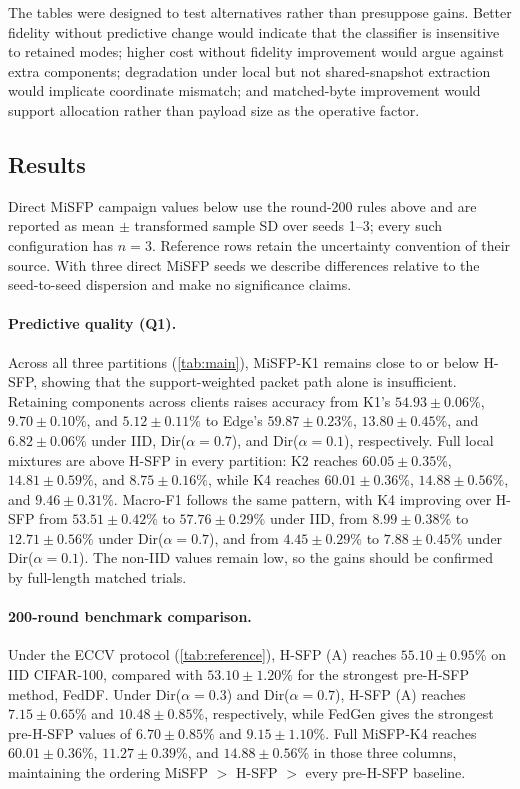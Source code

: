 The tables were designed to test alternatives rather than presuppose gains. Better fidelity without predictive change would indicate that the classifier is insensitive to retained modes; higher cost without fidelity improvement would argue against extra components; degradation under local but not shared-snapshot extraction would implicate coordinate mismatch; and matched-byte improvement would support allocation rather than payload size as the operative factor.

\subsection{Results}\label{sec:results}
Direct MiSFP campaign values below use the round-200 rules above and are reported as mean $\pm$ transformed sample SD over seeds 1--3; every such configuration has $n=3$. Reference rows retain the uncertainty convention of their source. With three direct MiSFP seeds we describe differences relative to the seed-to-seed dispersion and make no significance claims.

\paragraph{Predictive quality (Q1).}
Across all three partitions (\cref{tab:main}), MiSFP-K1 remains close to or below H-SFP, showing that the support-weighted packet path alone is insufficient. Retaining components across clients raises accuracy from K1's $54.93\pm0.06\%$, $9.70\pm0.10\%$, and $5.12\pm0.11\%$ to Edge's $59.87\pm0.23\%$, $13.80\pm0.45\%$, and $6.82\pm0.06\%$ under IID, Dir($\alpha{=}0.7$), and Dir($\alpha{=}0.1$), respectively. Full local mixtures are above H-SFP in every partition: K2 reaches $60.05\pm0.35\%$, $14.81\pm0.59\%$, and $8.75\pm0.16\%$, while K4 reaches $60.01\pm0.36\%$, $14.88\pm0.56\%$, and $9.46\pm0.31\%$. Macro-F1 follows the same pattern, with K4 improving over H-SFP from $53.51\pm0.42\%$ to $57.76\pm0.29\%$ under IID, from $8.99\pm0.38\%$ to $12.71\pm0.56\%$ under Dir($\alpha{=}0.7$), and from $4.45\pm0.29\%$ to $7.88\pm0.45\%$ under Dir($\alpha{=}0.1$). The non-IID values remain low, so the gains should be confirmed by full-length matched trials.

\paragraph{200-round benchmark comparison.}
Under the ECCV protocol (\cref{tab:reference}), H-SFP (A) reaches $55.10\pm0.95\%$ on IID CIFAR-100, compared with $53.10\pm1.20\%$ for the strongest pre-H-SFP method, FedDF. Under Dir($\alpha{=}0.3$) and Dir($\alpha{=}0.7$), H-SFP (A) reaches $7.15\pm0.65\%$ and $10.48\pm0.85\%$, respectively, while FedGen gives the strongest pre-H-SFP values of $6.70\pm0.85\%$ and $9.15\pm1.10\%$. Full MiSFP-K4 reaches $60.01\pm0.36\%$, $11.27\pm0.39\%$, and $14.88\pm0.56\%$ in those three columns, maintaining the ordering MiSFP $>$ H-SFP $>$ every pre-H-SFP baseline.

